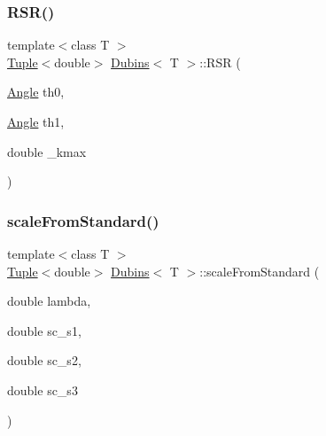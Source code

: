 \mbox{\label{class_dubins_acf4e7982a9faff05db4cff0b09d5ecc7}} 
\subsubsection{\texorpdfstring{RSR()}{RSR()}}
{\footnotesize\ttfamily template$<$class T $>$ \\
\mbox{\hyperlink{class_tuple}{Tuple}}$<$double$>$ \mbox{\hyperlink{class_dubins}{Dubins}}$<$ T $>$\+::R\+SR (\begin{DoxyParamCaption}\item[{\mbox{\hyperlink{class_angle}{Angle}}}]{th0,  }\item[{\mbox{\hyperlink{class_angle}{Angle}}}]{th1,  }\item[{double}]{\+\_\+kmax }\end{DoxyParamCaption})\hspace{0.3cm}{\ttfamily [inline]}}

\mbox{\label{class_dubins_a5f4cd38e551fc0e2abdc360459454344}} 
\subsubsection{\texorpdfstring{scaleFromStandard()}{scaleFromStandard()}}
{\footnotesize\ttfamily template$<$class T $>$ \\
\mbox{\hyperlink{class_tuple}{Tuple}}$<$double$>$ \mbox{\hyperlink{class_dubins}{Dubins}}$<$ T $>$\+::scale\+From\+Standard (\begin{DoxyParamCaption}\item[{double}]{lambda,  }\item[{double}]{sc\+\_\+s1,  }\item[{double}]{sc\+\_\+s2,  }\item[{double}]{sc\+\_\+s3 }\end{DoxyParamCaption})\hspace{0.3cm}{\ttfamily [inline]}}

\mbox{\label{class_dubins_afecc4ffa89c5f3952b1729edb87ac88c}} 
